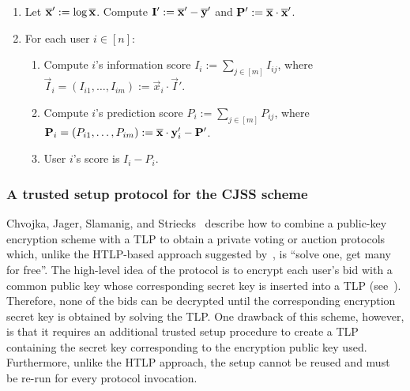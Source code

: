 \begin{enumerate}
    \item Let $\overline{\mathbf{x}}' := \log{\ensuremath{\overline{\mathbf{x}}}}$. Compute $\mathbf{I}' := \overline{\mathbf{x}}' - \overline{\mathbf{y}}'$ and $\mathbf{P}' := \overline{\mathbf{x}} \cdot \overline{\mathbf{x}}'$.
    \item For each user $i \in [n]$:
    \begin{enumerate}
        \item Compute $i$'s information score $I_i := \sum_{j \in [m]} I_{ij}$, where $\vec{I}_i = (I_{i1},\allowbreak \dots, I_{im}) := \vec{x}_i \cdot \vec{I}'$.
        \item Compute $i$'s prediction score $P_i := \sum_{j \in [m]} P_{ij}$, where $\mathbf{P}_i = (P_{i1},\allowbreak \dots, P_{im}) := \overline{\mathbf{x}} \cdot \mathbf{y}_i' - \mathbf{P}'$.
        \item User $i$'s score is $I_i - P_i$.
    \end{enumerate}
\end{enumerate}

\subsubsection{A trusted setup protocol for the CJSS scheme}\label{sec:seq_mpc_tlp}

Chvojka, Jager, Slamanig, and Striecks~\cite{ESORICS:CJSS21} describe how to combine a public-key encryption scheme with a TLP to obtain a private voting or auction protocols which, unlike the HTLP-based approach suggested by~\cite{C:MalThy19}, is ``solve one, get many for free''. The high-level idea of the protocol is to encrypt each user's bid with a common public key whose corresponding secret key is inserted into a TLP (see~). Therefore, none of the bids can be decrypted until the corresponding encryption secret key is obtained by solving the TLP. One drawback of this scheme, however, is that it requires an additional trusted setup procedure to create a TLP containing the secret key corresponding to the encryption public key used. Furthermore, unlike the HTLP approach, the setup cannot be reused and must be re-run for every protocol invocation.

